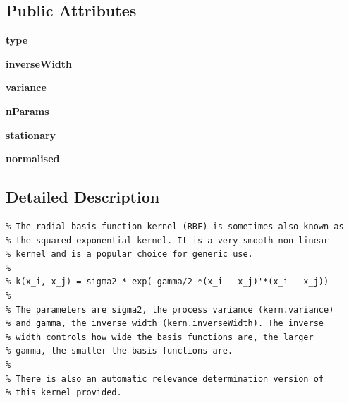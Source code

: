 \subsection*{Public Attributes}
\begin{CompactItemize}
\item 
\hypertarget{classkern_1_1rbf_b5215a71a9932013ae3919e0385aeee5}{
\textbf{type}}
\label{classkern_1_1rbf_b5215a71a9932013ae3919e0385aeee5}

\item 
\hypertarget{classkern_1_1rbf_d5a8729d56b374ebabcf17172235db08}{
\textbf{inverseWidth}}
\label{classkern_1_1rbf_d5a8729d56b374ebabcf17172235db08}

\item 
\hypertarget{classkern_1_1rbf_d6605302395ff7a395d1dcf4e905b6aa}{
\textbf{variance}}
\label{classkern_1_1rbf_d6605302395ff7a395d1dcf4e905b6aa}

\item 
\hypertarget{classkern_1_1rbf_27e852c7586f034079127ee44f53d7d4}{
\textbf{nParams}}
\label{classkern_1_1rbf_27e852c7586f034079127ee44f53d7d4}

\item 
\hypertarget{classkern_1_1rbf_54cd07c0448c54143b0bf58ddf47e8fb}{
\textbf{stationary}}
\label{classkern_1_1rbf_54cd07c0448c54143b0bf58ddf47e8fb}

\item 
\hypertarget{classkern_1_1rbf_167598c8831ddce0d7596e6ed2041b2f}{
\textbf{normalised}}
\label{classkern_1_1rbf_167598c8831ddce0d7596e6ed2041b2f}

\end{CompactItemize}


\subsection{Detailed Description}


\footnotesize\begin{verbatim}% The radial basis function kernel (RBF) is sometimes also known as
% the squared exponential kernel. It is a very smooth non-linear
% kernel and is a popular choice for generic use.
%
% k(x_i, x_j) = sigma2 * exp(-gamma/2 *(x_i - x_j)'*(x_i - x_j))
%
% The parameters are sigma2, the process variance (kern.variance)
% and gamma, the inverse width (kern.inverseWidth). The inverse
% width controls how wide the basis functions are, the larger
% gamma, the smaller the basis functions are.
%
% There is also an automatic relevance determination version of
% this kernel provided.

\end{verbatim}
\normalsize
 

